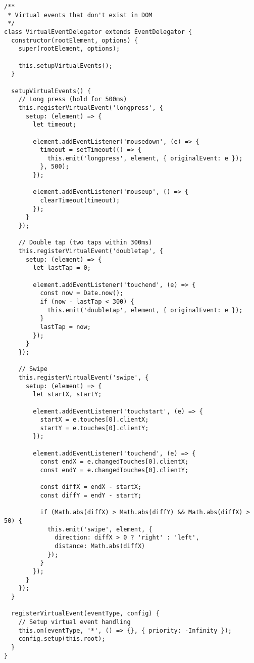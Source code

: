 \documentclass[11pt]{article}
\begin{document}
\begin{verbatim}
/**
 * Virtual events that don't exist in DOM
 */
class VirtualEventDelegator extends EventDelegator {
  constructor(rootElement, options) {
    super(rootElement, options);
    
    this.setupVirtualEvents();
  }
  
  setupVirtualEvents() {
    // Long press (hold for 500ms)
    this.registerVirtualEvent('longpress', {
      setup: (element) => {
        let timeout;
        
        element.addEventListener('mousedown', (e) => {
          timeout = setTimeout(() => {
            this.emit('longpress', element, { originalEvent: e });
          }, 500);
        });
        
        element.addEventListener('mouseup', () => {
          clearTimeout(timeout);
        });
      }
    });
    
    // Double tap (two taps within 300ms)
    this.registerVirtualEvent('doubletap', {
      setup: (element) => {
        let lastTap = 0;
        
        element.addEventListener('touchend', (e) => {
          const now = Date.now();
          if (now - lastTap < 300) {
            this.emit('doubletap', element, { originalEvent: e });
          }
          lastTap = now;
        });
      }
    });
    
    // Swipe
    this.registerVirtualEvent('swipe', {
      setup: (element) => {
        let startX, startY;
        
        element.addEventListener('touchstart', (e) => {
          startX = e.touches[0].clientX;
          startY = e.touches[0].clientY;
        });
        
        element.addEventListener('touchend', (e) => {
          const endX = e.changedTouches[0].clientX;
          const endY = e.changedTouches[0].clientY;
          
          const diffX = endX - startX;
          const diffY = endY - startY;
          
          if (Math.abs(diffX) > Math.abs(diffY) && Math.abs(diffX) > 50) {
            this.emit('swipe', element, {
              direction: diffX > 0 ? 'right' : 'left',
              distance: Math.abs(diffX)
            });
          }
        });
      }
    });
  }
  
  registerVirtualEvent(eventType, config) {
    // Setup virtual event handling
    this.on(eventType, '*', () => {}, { priority: -Infinity });
    config.setup(this.root);
  }
}
\end{verbatim}
\end{document}
